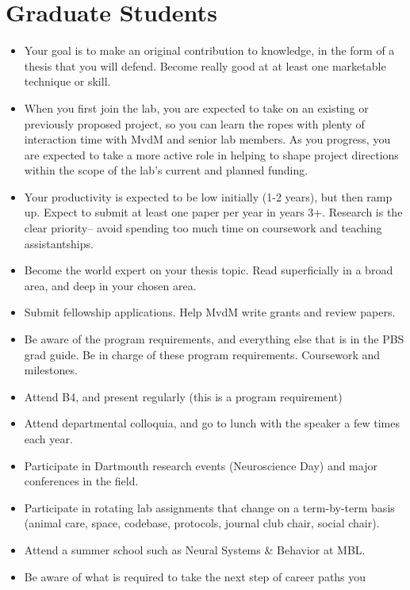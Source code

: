 \documentclass{tufte-book}
\begin{document}
\section{Graduate Students}\label{sec:gradstudents}

\begin{itemize}
\item{Your goal is to make an original contribution to knowledge, in the
form of a thesis that you will defend. Become really good at at least
one marketable technique or skill.}
\item{When you first join the lab, you are expected to take on an existing
or previously proposed project, so you can learn the ropes with plenty
of interaction time with MvdM and senior lab members. As you progress,
you are expected to take a more active role in helping to shape
project directions within the scope of the lab's current and planned
funding.}
\item{Your productivity is expected to be low initially (1-2 years), but
then ramp up. Expect to submit at least one paper per year in years
3+. Research is the clear priority-- avoid spending too much time on
coursework and teaching assistantships.}
\item{Become the world expert on your thesis topic. Read superficially in a
broad area, and deep in your chosen area.}
\item{Submit fellowship applications. Help MvdM write grants and review
papers.}
\item{Be aware of the program requirements, and everything else that is in
the PBS grad guide.  Be in charge of these program
requirements. Coursework and milestones.}
\item{Attend B4, and present regularly (this is a program requirement)}
\item{Attend departmental colloquia, and go to lunch with the speaker a few
times each year.}
\item{Participate in Dartmouth research events (Neuroscience Day) and major
conferences in the field.}
\item{Participate in rotating lab assignments that change on a term-by-term
basis (animal care, space, codebase, protocols, journal club chair,
social chair).}
\item{Attend a summer school such as Neural Systems \& Behavior at
MBL.}
\item{Be aware of what is required to take the next step of career paths you
}
\end{itemize}
\end{document}
